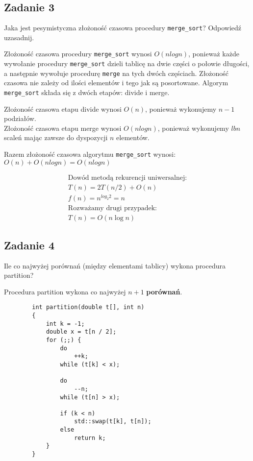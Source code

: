 \documentclass{article}
\begin{document}
    \subsection*{Zadanie 3}
    Jaka jest pesymistyczna złożoność czasowa procedury \verb+merge_sort+? Odpowiedź uzasadnij.
    \begin{center}
        Złożoność czasowa procedury \verb+merge_sort+ wynosi $O(nlogn)$, ponieważ każde wywołanie procedury 
        \verb+merge_sort+ dzieli tablicę na dwie części o połowie długości, a następnie wywołuje procedurę \verb+merge+ 
        na tych dwóch częściach. Złożoność czasowa nie zależy od ilości elementów i tego jak są posortowane. 
        Algorym \verb+merge_sort+ składa się z dwóch etapów: divide i merge. \\
        \begin{center}
            Złożoność czasowa etapu divide wynosi $O(n)$, ponieważ wykonujemy $n - 1$ podziałów. \\
            Złożoność czasowa etapu merge wynosi $O(nlogn)$, ponieważ wykonujemy $lb n$ scaleń mając zawsze
            do dyspozycji $n$ elementów. \\                
        \end{center}
        Razem złożoność czasowa algorytmu \verb+merge_sort+ wynosi: $O(n) + O(nlogn) = O(nlogn)$
    \end{center}
    \begin{gather*}
        \text{Dowód metodą rekurencji uniwersalnej:} \\
        T(n) = 2T(n/2) + O(n) \\
        f(n) = n^{log_2 2} = n \\
        \text{Rozważamy drugi przypadek:} \\
        T(n) = O(n \log n)
    \end{gather*}

    \subsection*{Zadanie 4}
    Ile co najwyżej porównań (między elementami tablicy) wykona procedura partition?
    \begin{center}
        Procedura partition wykona co najwyżej $n + 1$ \textbf{porównań}. \\
    \end{center}

    \begin{lstlisting}
        int partition(double t[], int n) 
        {
            int k = -1;
            double x = t[n / 2];
            for (;;) {
                do
                    ++k;
                while (t[k] < x);

                do
                    --n;
                while (t[n] > x);

                if (k < n)
                    std::swap(t[k], t[n]);
                else
                    return k;
            }
        }
    \end{lstlisting}
\end{document}
